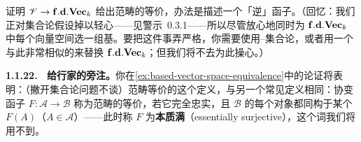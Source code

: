 \begin{exercise}\label{ex:based-vector-space-equivalence}
证明 $\mathscr{V}\to\mathbf{f.d.Vec}_{k}$ 给出范畴的等价，办法是描述一个「逆」函子。（回忆：我们正对集合论假设掉以轻心——见警示~0.3.1——所以尽管放心地同时为 $\mathbf{f.d.Vec}_{k}$ 中每个向量空间选一组基。要把这件事弄严格，你需要使用\trGodel--\trBernays{}集合论，或者用一个与此非常相似的\trSmallCategory{}来替换 $\mathbf{f.d.Vec}_{k}$；但我们将不去为此操心。）
\end{exercise}

\textbf{1.1.22. \extrahard\ 给行家的旁注。}\quad 你在\cref{ex:based-vector-space-equivalence}中的论证将表明：（撇开集合论问题不谈）范畴等价的这个定义，与另一个常见定义相同：协变函子 $F\colon\mathscr{A}\to\mathscr{B}$ 称为范畴的等价，若它完全忠实，且 $\mathscr{B}$ 的每个对象都同构于某个 $F(A)$（$A\in\mathscr{A}$）——此时称 $F$ 为\textbf{本质满}（essentially surjective），这个词我们将用不到。

